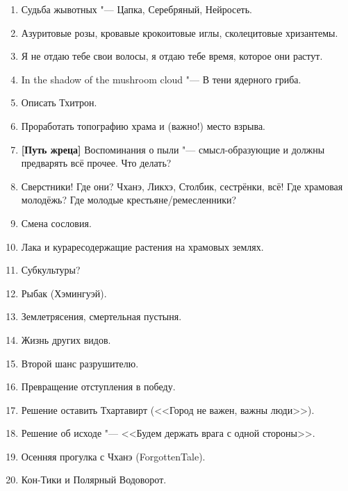 \documentclass[a4paper,10pt,fleqn]{book}
\begin{document}
\begin{enumerate}
\item Судьба жывотных "--- Цапка, Серебряный, Нейросеть.

\item Азуритовые розы, кровавые крокоитовые иглы, сколецитовые хризантемы.

\item Я не отдаю тебе свои волосы, я отдаю тебе время, которое они растут.

\item In the shadow of the mushroom cloud "--- В тени ядерного гриба.

\item Описать Тхитрон.

\item Проработать топографию храма и (важно!) место взрыва.

\item \textbf{[Путь жреца]} Воспоминания о пыли "--- смысл-образующие и должны предварять всё прочее.
Что делать?

\item Сверстники!
Где они?
Чханэ, Ликхэ, Столбик, сестрёнки, всё!
Где храмовая молодёжь?
Где молодые крестьяне/ремесленники?

\item Смена сословия.

\item Лака и кураресодержащие растения на храмовых землях.

\item Субкультуры?

\item Рыбак (Хэмингуэй).

\item Землетрясения, смертельная пустыня.

\item Жизнь других видов.

\item Второй шанс разрушителю.

\item Превращение отступления в победу.

\item Решение оставить Тхартавирт (<<Город не важен, важны люди>>).

\item Решение об исходе "--- <<Будем держать врага с одной стороны>>.

\item Осенняя прогулка с Чханэ (ForgottenTale).

\item Кон-Тики и Полярный Водоворот.


\end{enumerate}
\end{document}
